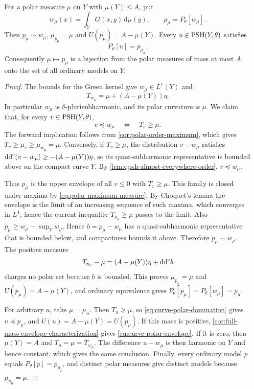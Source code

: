 \begin{lemma}\label{lem:curve-polar-model}
For a polar measure $\mu$ on $Y$ with $\mu(Y)\leq A$, put
\[
 w_\mu(x)=\int_YG(x,y)\,\mathrm{d}\mu(y),\qquad
 p_\mu=P_\theta[w_\mu].
\]
Then $p_\mu\sim w_\mu$, $\mu_{p_\mu}=\mu$ and $U(p_\mu)=A-\mu(Y)$. Every $u\in\mathrm{PSH}(Y,\theta)$ satisfies
\begin{equation}\label{eq:curve-polar-envelope}
 P_\theta[u]=p_{\mu_u}.
\end{equation}
Consequently $\mu\mapsto p_\mu$ is a bijection from the polar measures of mass at most $A$ onto the set of all ordinary models on $Y$.
\end{lemma}
\begin{proof}
The bounds for the Green kernel give $w_\mu\in L^1(Y)$ and
\[
 T_{w_\mu}=\mu+(A-\mu(Y))\eta.
\]
In particular $w_\mu$ is $\theta$-plurisubharmonic, and its polar curvature is $\mu$. We claim that, for every $v\in\mathrm{PSH}(Y,\theta)$,
\begin{equation}\label{eq:curve-polar-domination}
 v\preceq w_\mu\quad\Longleftrightarrow\quad T_v\geq\mu.
\end{equation}
The forward implication follows from \cref{cor:polar-order-maximum}, which gives $T_v\geq\mu_v\geq\mu_{w_\mu}=\mu$. Conversely, if $T_v\geq\mu$, the distribution $v-w_\mu$ satisfies $\mathrm{dd}^{\mathrm{c}}(v-w_\mu)\geq-(A-\mu(Y))\eta$, so its quasi-subharmonic representative is bounded above on the compact curve $Y$. By \cref{lem:qpsh-almost-everywhere-order}, $v\preceq w_\mu$.

Thus $p_\mu$ is the upper envelope of all $v\leq0$ with $T_v\geq\mu$. This family is closed under maxima by \eqref{eq:polar-maximum-measure}. By Choquet's lemma the envelope is the limit of an increasing sequence of such maxima, which converges in $L^1$; hence the current inequality $T_{p_\mu}\geq\mu$ passes to the limit. Also $p_\mu\geq w_\mu-\sup_Yw_\mu$. Hence $b=p_\mu-w_\mu$ has a quasi-subharmonic representative that is bounded below, and compactness bounds it above. Therefore $p_\mu\sim w_\mu$. The positive measure
\[
 T_{p_\mu}-\mu=(A-\mu(Y))\eta+\mathrm{dd}^{\mathrm{c}} b
\]
charges no polar set because $b$ is bounded. This proves $\mu_{p_\mu}=\mu$ and $U(p_\mu)=A-\mu(Y)$, and ordinary equivalence gives $P_\theta[p_\mu]=P_\theta[w_\mu]=p_\mu$.

For arbitrary $u$, take $\mu=\mu_u$. Then $T_u\geq\mu$, so \eqref{eq:curve-polar-domination} gives $u\preceq p_\mu$, and $U(u)=A-\mu(Y)=U(p_\mu)$. If this mass is positive, \cref{cor:full-mass-envelope-characterization} gives \eqref{eq:curve-polar-envelope}. If it is zero, then $\mu(Y)=A$ and $T_u=\mu=T_{w_\mu}$. The difference $u-w_\mu$ is then harmonic on $Y$ and hence constant, which gives the same conclusion. Finally, every ordinary model $p$ equals $P_\theta[p]=p_{\mu_p}$, and distinct polar measures give distinct models because $\mu_{p_\mu}=\mu$.
\end{proof}

